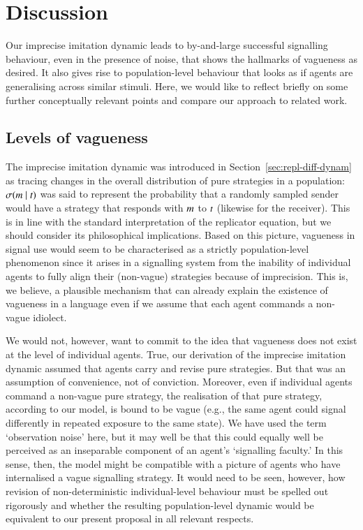\documentclass[12pt,english]{article}
\numberwithin{equation}{section}
\begin{document}

\section{Discussion}
\label{sec:discussion}

Our imprecise imitation dynamic leads to by-and-large successful signalling behaviour, even in
the presence of noise, that shows the hallmarks of vagueness as desired. It also gives rise to
population-level behaviour that looks as if agents are generalising across similar
stimuli. Here, we would like to reflect briefly on some further conceptually relevant points
and compare our approach to related work.

\subsection{Levels of vagueness}
The imprecise imitation dynamic was introduced in Section~\ref{sec:repl-diff-dynam} as tracing
changes in the overall distribution of pure strategies in a population:
$\sigma(m \mid t)$ was said to represent the probability that a randomly sampled
sender would have a strategy that responds with $m$ to $t$ (likewise for the
receiver). This is in line with the standard interpretation of the replicator equation, but we
should consider its philosophical implications. Based on this picture, vagueness in signal use
would seem to be characterised as a strictly population-level phenomenon since it arises in a
signalling system from the inability of individual agents to fully align their (non-vague)
strategies because of imprecision. This is, we believe, a plausible mechanism that can already
explain the existence of vagueness in a language even if we assume that each agent commands a
non-vague idiolect.

We would not, however, want to commit to the idea that vagueness does not exist at the level of
individual agents. True, our derivation of the imprecise imitation dynamic assumed that agents
carry and revise pure strategies. But that was an assumption of convenience, not of
conviction. Moreover, even if individual agents command a non-vague pure strategy, the
realisation of that pure strategy, according to our model, is bound to be vague (e.g., the same
agent could signal differently in repeated exposure to the same state). We have used the term
`observation noise' here, but it may well be that this could equally well be perceived as an
inseparable component of an agent's `signalling faculty.' In this sense, then, the model might
be compatible with a picture of agents who have internalised a vague signalling
strategy. It would need to be seen, however, how revision of non-deterministic individual-level
behaviour must be spelled out rigorously and whether the resulting population-level dynamic
would be equivalent to our present proposal in all relevant respects.
\end{document}
